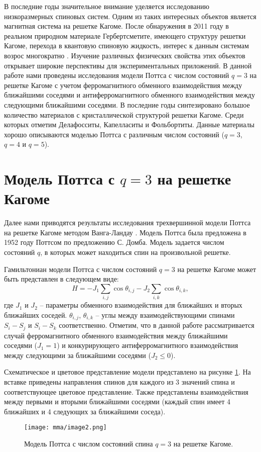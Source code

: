 В последние годы значительное внимание уделяется исследованию низкоразмерных спиновых систем. Одним из таких интересных объектов является магнитная система на решетке Кагоме. После обнаружения в 2011 году в реальном природном материале Гербертсметите, имеющего структуру решетки Кагоме, перехода в квантовую спиновую жидкость, интерес к данным системам возрос многократно \cite{mma-bib-2}. Изучение различных физических свойства этих объектов открывает широкие перспективы для экспериментальных приложений. В данной работе нами проведены исследования модели Поттса с числом состояний $q=3$ на решетке Кагоме с учетом ферромагнитного обменного взаимодействия между ближайшими соседями и антиферромагнитного обменного взаимодействия между следующими ближайшими соседями. В последние годы синтезировано большое количество материалов с кристаллической структурой решетки Кагоме. Среди которых отметим Делафосситы, Капелласиты и Фольбортиты. Данные материалы хорошо описываются моделью Поттса с различным числом состояний ($q=3$, $q=4$ и $q=5$).


\section{Модель Поттса с \texorpdfstring{$q=3$}{q=3} на решетке Кагоме}

Далее нами приводятся результаты исследования трехвершинной модели Поттса на решетке Кагоме методом Ванга-Ландау \cite{mma-bib-1, mma-bib-2}. Модель Поттса была предложена в 1952 году Поттсом по предложению С. Домба. Модель задается числом состояний $q$, в которых может находиться спин на произвольной решетке.

Гамильтониан модели Поттса с числом состояний $q=3$ на решетке Кагоме может быть представлен в следующем виде:
\begin{equation}
    \label{mma-eq-1}
    H = - J_1 \sum_{i, j} \cos \theta_{i, j} - J_2 \sum_{i, k} \cos \theta_{i, k},
\end{equation}
где $J_1$ и $J_2$ -- параметры обменного взаимодействия для ближайших и вторых ближайших соседей. $\theta_{i,j}$, $\theta_{i,k}$ -- углы между взаимодействующими спинами $S_i - S_j$ и $S_i - S_k$ соответственно. Отметим, что в данной работе рассматривается случай ферромагнитного обменного взаимодействия между ближайшими соседями ($J_1 = 1$) и конкурирующего антиферромагнитного взаимодействия между следующими за ближайшими соседями ($J_2 \leq 0$).

Схематическое и цветовое представление модели представлено на рисунке \ref{mma-fig-1}. На вставке приведены направления спинов для каждого из 3 значений спина и соответствующее цветовое представление. Также представлены взаимодействия между первыми и вторыми ближайшими соседями (каждый спин имеет 4 ближайших и 4 следующих за ближайшими соседа).
\begin{figure}[h]
    \begin{center}
        \texttt{[image: mma/image2.png]}
    \end{center}
    \caption{Модель Поттса с числом состояний спина $q = 3$ на решетке Кагоме.}
    \label{mma-fig-1}
\end{figure}

